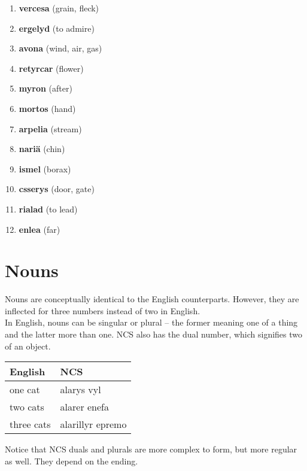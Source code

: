 \begin{enumerate}
  \item \textbf{vercesa} (grain, fleck)
  \item \textbf{ergelyd} (to admire)
  \item \textbf{avona} (wind, air, gas)
  \item \textbf{retyrcar} (flower)
  \item \textbf{myron} (after)
  \item \textbf{mortos} (hand)
  \item \textbf{arpelia} (stream)
  \item \textbf{nari\"a} (chin)
  \item \textbf{ismel} (borax)
  \item \textbf{csserys} (door, gate)
  \item \textbf{rialad} (to lead)
  \item \textbf{enlea} (far)
\end{enumerate}

\section{Nouns}

Nouns are conceptually identical to the English counterparts. However, they are inflected for three numbers instead of two in English. \\

In English, nouns can be singular or plural -- the former meaning one of a thing and the latter more than one. NCS also has the dual number, which signifies two of an object.

\begin{center}
  \begin{tabular}{|l|l|}
    \hline
    \textbf{English} & \textbf{NCS} \\ \hline
    one cat & alarys vyl \\ \hline
    two cats & alarer enefa \\ \hline
    three cats & alarillyr epremo \\ \hline
  \end{tabular}
\end{center}

Notice that NCS duals and plurals are more complex to form, but more regular as well. They depend on the ending.

